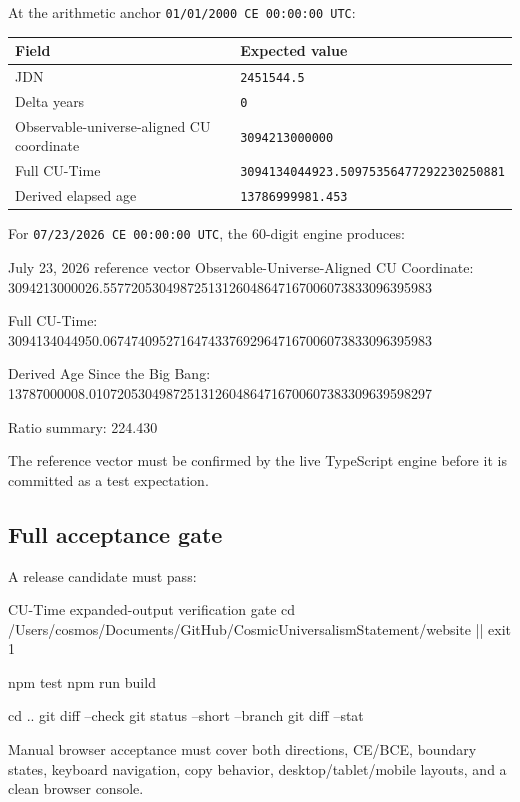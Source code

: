 \documentclass[11pt,letterpaper]{article}
\begin{document}
At the arithmetic anchor \texttt{01/01/2000 CE 00:00:00 UTC}:

\begin{tabularx}{\textwidth}{L{2.4in}Y}
\toprule
\textbf{Field} & \textbf{Expected value} \\
\midrule
JDN & \texttt{2451544.5} \\
Delta years & \texttt{0} \\
Observable-universe-aligned CU coordinate & \texttt{3094213000000} \\
Full CU-Time & \texttt{3094134044923.50975356477292230250881} \\
Derived elapsed age & \texttt{13786999981.453} \\
\bottomrule
\end{tabularx}

For \texttt{07/23/2026 CE 00:00:00 UTC}, the 60-digit engine produces:

\begin{codebox}{July 23, 2026 reference vector}
Observable-Universe-Aligned CU Coordinate:
3094213000026.55772053049872513126048647167006073833096395983

Full CU-Time:
3094134044950.06747409527164743376929647167006073833096395983

Derived Age Since the Big Bang:
13787000008.0107205304987251312604864716700607383309639598297

Ratio summary:
224.430
\end{codebox}

The reference vector must be confirmed by the live TypeScript engine before it
is committed as a test expectation.

\subsection{Full acceptance gate}

A release candidate must pass:

\begin{commandbox}{CU-Time expanded-output verification gate}
cd /Users/cosmos/Documents/GitHub/CosmicUniversalismStatement/website || exit 1

npm test
npm run build

cd ..
git diff --check
git status --short --branch
git diff --stat
\end{commandbox}

Manual browser acceptance must cover both directions, CE/BCE, boundary states,
keyboard navigation, copy behavior, desktop/tablet/mobile layouts, and a clean
browser console.
\end{document}
